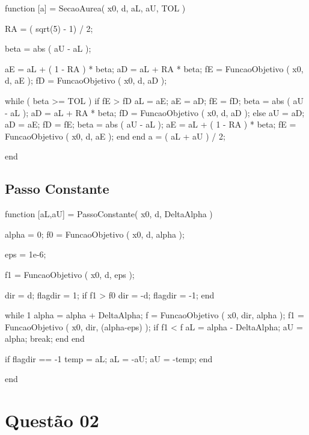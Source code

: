 \documentclass[a4paper, 12pt]{article}
\begin{document}
\begin{titlepage}
\sloppy
{}
\graphicspath{ {./L01_Latex_images/} }


\begin{matlabcode}

function [a] = SecaoAurea( x0, d, aL, aU, TOL )

RA = ( sqrt(5) - 1) / 2;

beta = abs ( aU - aL );

aE = aL + ( 1 - RA ) * beta;   
aD = aL +  RA * beta;   
fE = FuncaoObjetivo ( x0, d, aE );
fD = FuncaoObjetivo ( x0, d, aD );

while ( beta >= TOL )
	if fE > fD
        aL = aE;
        aE = aD;
        fE = fD;
        beta = abs ( aU - aL );
        aD = aL +  RA * beta;
        fD = FuncaoObjetivo ( x0, d, aD );
    else
        aU = aD;
        aD = aE;
        fD = fE; 
        beta = abs ( aU - aL );
        aE = aL +  ( 1 - RA ) * beta;
        fE = FuncaoObjetivo ( x0, d, aE );
    end
end
a = ( aL + aU ) / 2;

end

\end{matlabcode}


\subsection{Passo Constante}
\begin{matlabcode}

function [aL,aU] = PassoConstante( x0, d, DeltaAlpha )

alpha = 0;
f0 = FuncaoObjetivo ( x0, d, alpha );

eps = 1e-6;

f1 = FuncaoObjetivo ( x0, d, eps );

dir = d;
flagdir = 1;
if f1 > f0
   dir = -d;
   flagdir = -1;
end

while 1
   alpha = alpha + DeltaAlpha;
   f = FuncaoObjetivo ( x0, dir, alpha );
   f1 = FuncaoObjetivo ( x0, dir, (alpha-eps) );
   if  f1 < f
      aL = alpha - DeltaAlpha;
	  aU = alpha;
	  break;
   end
end

if flagdir == -1
   temp = aL;
   aL = -aU;
   aU = -temp;
end

end

\end{matlabcode}


\newpage
\section{Questão 02}


\end{titlepage}
\end{document}
